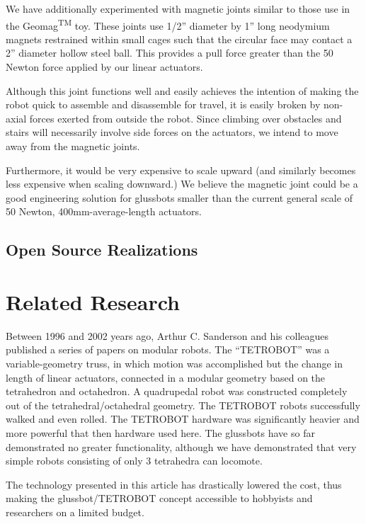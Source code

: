 \documentclass[11pt]{article}
\begin{document}
We have additionally experimented with magnetic joints similar to those use in the Geomag\textsuperscript{TM} toy.
These joints use 1/2'' diameter by 1'' long neodymium magnets restrained within small cages such that the circular face
may contact a 2'' diameter hollow steel ball.  This provides a pull force greater than the 50 Newton force applied by our linear
actuators.

Although this joint functions well and easily achieves the intention of making the robot quick to assemble and
disassemble for travel,
it is easily broken by non-axial forces exerted from outside the robot.
Since climbing over obstacles and stairs will necessarily involve side forces on the actuators,
we intend to move away from the magnetic joints.

Furthermore, it would be very expensive to scale upward (and similarly becomes less expensive when
scaling downward.) We believe the magnetic joint could be a good engineering solution for glussbots smaller than the current
general scale of 50 Newton, 400mm-average-length actuators.


\subsection{Open Source Realizations}

\section{Related Research}

Between 1996 and 2002 years ago, Arthur C. Sanderson and his colleagues published a series of
papers\cite{sanderson1996modular,lee2002dynamic,lee1999dynamics} on modular robots.
The ``TETROBOT'' was a variable-geometry truss, in which motion was accomplished but the change
in length of linear actuators, connected in a modular geometry based on the tetrahedron and octahedron.
A quadrupedal robot was constructed completely out of the tetrahedral/octahedral geometry.
The TETROBOT robots successfully walked and even rolled. The TETROBOT hardware was significantly
heavier and more powerful that then hardware used here. The glussbots have so far demonstrated no greater functionality,
although we have demonstrated that very simple robots consisting of only 3 tetrahedra can locomote.

The technology presented in this article has drastically lowered the cost,
thus making the glussbot/TETROBOT concept
accessible to hobbyists and researchers on a limited budget.
\end{document}
